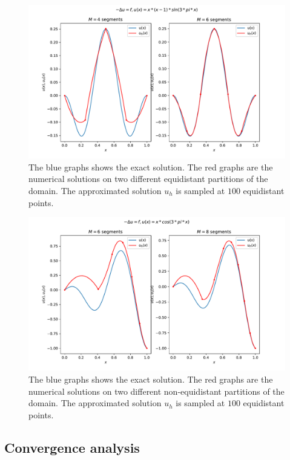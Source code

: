 \begin{figure}
  \centering
  \includegraphics[width=\textwidth]{Images/plots/task1_test_sol1.pdf}
  \caption{The blue graphs shows the exact solution.
  The red graphs are the numerical solutions on two
different equidistant partitions of the domain.
The approximated solution \( u_h \) is sampled at \( 100 \)
equidistant points.}
  \label{fig:test_eq1}
\end{figure}

\begin{figure}
  \centering
  \includegraphics[width=\textwidth]{Images/plots/task1_test_sol2_non_unif.pdf}
  \caption{The blue graphs shows the exact solution.
  The red graphs are the numerical solutions on two
different non-equidistant partitions of the domain.
The approximated solution \( u_h \) is sampled at \( 100 \)
equidistant points.}
  \label{fig:test_eq2}
\end{figure}

\subsection{Convergence analysis}


